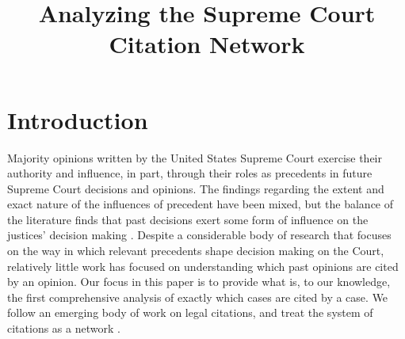 \documentclass[headsepline=true, abstracton]{scrartcl}
\begin{document}
\renewcommand{\refname}{Bibliography}


\onehalfspacing
\setlength{\headsep}{15mm}


\thispagestyle{plain}

\title{\Large Analyzing the Supreme Court Citation Network}
\maketitle

\begin{abstract}
\noindent 
\end{abstract}


 \section{Introduction}
 
 
 
 
Majority opinions written by the United States Supreme Court exercise their authority and influence, in part, through their roles as precedents in future Supreme Court decisions and opinions. The findings regarding the extent and exact nature of the influences of precedent have been mixed, but the balance of the literature finds that past decisions exert some form of influence on the justices' decision making \citep{knight1996norm,gillman2001s,richards2002jurisprudential,hansford2006politics,bailey2008does,bailey2011constrained}. Despite a considerable body of research that focuses on the way in which relevant precedents shape decision making on the Court, relatively little work has focused on understanding which past opinions are cited by an opinion. Our focus in this paper is to provide what is, to our knowledge, the first comprehensive analysis of exactly which cases are cited by a case. We follow an emerging body of work on legal citations, and treat the system of citations as a network \citep[e.g., ][]{fowler2007network, fowler2008authority,bommarito2009law,lupu2012precedent,pelc2014politics}. 
\end{document}
